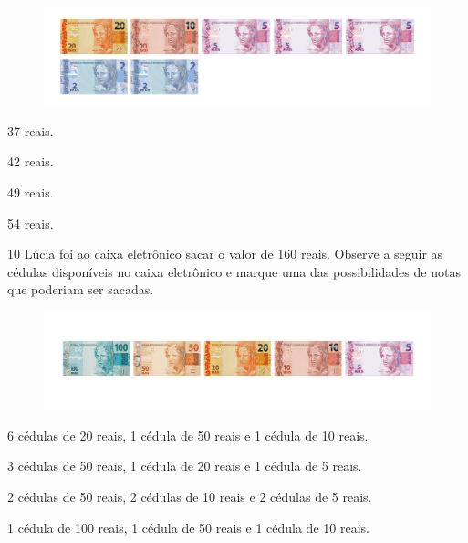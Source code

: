 \begin{figure}[htpb!]
\includegraphics[width=\textwidth]{./media/image145.png}
\end{figure}

\begin{escolha}
\item 37 reais.

\item 42 reais.

\item 49 reais.

\item 54 reais.
\end{escolha}

\num{10} Lúcia foi ao caixa eletrônico sacar o valor de 160 reais. Observe a seguir
as cédulas disponíveis no caixa eletrônico e marque uma das
possibilidades de notas que poderiam ser sacadas.

\begin{figure}[htpb!]
\includegraphics[width=\textwidth]{./media/image146.png}
\end{figure}

\begin{escolha}
\item 6 cédulas de 20 reais, 1 cédula de 50 reais e 1 cédula de 10 reais.

\item 3 cédulas de 50 reais, 1 cédula de 20 reais e 1 cédula de 5 reais.

\item 2 cédulas de 50 reais, 2 cédulas de 10 reais e 2 cédulas de 5 reais.

\item 1 cédula de 100 reais, 1 cédula de 50 reais e 1 cédula de 10 reais.
\end{escolha}

